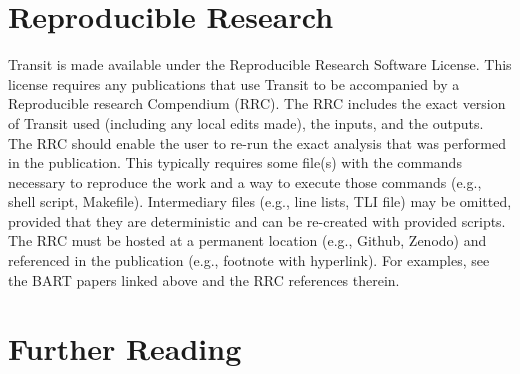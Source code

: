 \documentclass[letterpaper, 12pt]{article}
\begin{document}
\section{Reproducible Research}

Transit is made available under the Reproducible Research Software License.  
This license requires any publications that use Transit to be accompanied by a Reproducible research Compendium (RRC). 
The RRC includes the exact version of Transit used (including any local edits made), the inputs, and the outputs.  
The RRC should enable the user to re-run the exact analysis that was performed in the publication.  
This typically requires some file(s) with the commands necessary to reproduce the work and a way to execute those commands (e.g., shell script, Makefile).  
Intermediary files (e.g., line lists, TLI file) may be omitted, provided that they are deterministic and can be re-created with provided scripts.
The RRC must be hosted at a permanent location (e.g., Github, Zenodo) and referenced in the publication (e.g., footnote with hyperlink).
For examples, see the BART papers linked above and the RRC references therein.



\section{Further Reading}
\label{sec:furtherreading}

%
\end{document}
